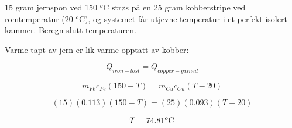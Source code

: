 

15 gram jernspon ved 150 $^{o}$C strøs på en 25 gram kobberstripe ved romtemperatur (20 $^{o}$C), og systemet får utjevne temperatur i et perfekt isolert kammer. Beregn slutt-temperaturen.







Varme tapt av jern er lik varme opptatt av kobber:

$$Q_{iron-lost} = Q_{copper-gained}$$

$$m_{Fe}c_{Fe} (150 - T) = m_{Cu}c_{Cu} (T - 20)$$

$$(15)(0.113)(150 - T) = (25)(0.093)(T - 20)$$

$$T = 74.81^o\hbox{C}$$










